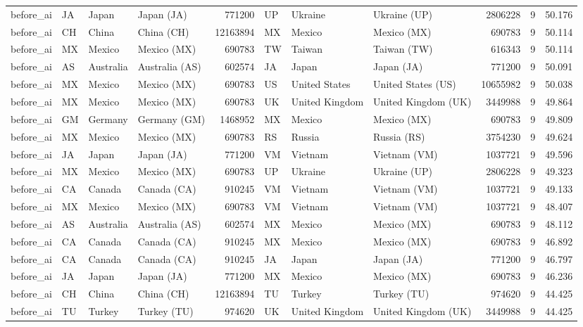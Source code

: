 \begin{tabular}{llllrlllrrr}
before\_ai & JA & Japan & Japan (JA) & 771200 & UP & Ukraine & Ukraine (UP) & 2806228 & 9 & 50.176 \\
before\_ai & CH & China & China (CH) & 12163894 & MX & Mexico & Mexico (MX) & 690783 & 9 & 50.114 \\
before\_ai & MX & Mexico & Mexico (MX) & 690783 & TW & Taiwan & Taiwan (TW) & 616343 & 9 & 50.114 \\
before\_ai & AS & Australia & Australia (AS) & 602574 & JA & Japan & Japan (JA) & 771200 & 9 & 50.091 \\
before\_ai & MX & Mexico & Mexico (MX) & 690783 & US & United States & United States (US) & 10655982 & 9 & 50.038 \\
before\_ai & MX & Mexico & Mexico (MX) & 690783 & UK & United Kingdom & United Kingdom (UK) & 3449988 & 9 & 49.864 \\
before\_ai & GM & Germany & Germany (GM) & 1468952 & MX & Mexico & Mexico (MX) & 690783 & 9 & 49.809 \\
before\_ai & MX & Mexico & Mexico (MX) & 690783 & RS & Russia & Russia (RS) & 3754230 & 9 & 49.624 \\
before\_ai & JA & Japan & Japan (JA) & 771200 & VM & Vietnam & Vietnam (VM) & 1037721 & 9 & 49.596 \\
before\_ai & MX & Mexico & Mexico (MX) & 690783 & UP & Ukraine & Ukraine (UP) & 2806228 & 9 & 49.323 \\
before\_ai & CA & Canada & Canada (CA) & 910245 & VM & Vietnam & Vietnam (VM) & 1037721 & 9 & 49.133 \\
before\_ai & MX & Mexico & Mexico (MX) & 690783 & VM & Vietnam & Vietnam (VM) & 1037721 & 9 & 48.407 \\
before\_ai & AS & Australia & Australia (AS) & 602574 & MX & Mexico & Mexico (MX) & 690783 & 9 & 48.112 \\
before\_ai & CA & Canada & Canada (CA) & 910245 & MX & Mexico & Mexico (MX) & 690783 & 9 & 46.892 \\
before\_ai & CA & Canada & Canada (CA) & 910245 & JA & Japan & Japan (JA) & 771200 & 9 & 46.797 \\
before\_ai & JA & Japan & Japan (JA) & 771200 & MX & Mexico & Mexico (MX) & 690783 & 9 & 46.236 \\
before\_ai & CH & China & China (CH) & 12163894 & TU & Turkey & Turkey (TU) & 974620 & 9 & 44.425 \\
before\_ai & TU & Turkey & Turkey (TU) & 974620 & UK & United Kingdom & United Kingdom (UK) & 3449988 & 9 & 44.425 \\

\end{tabular}
